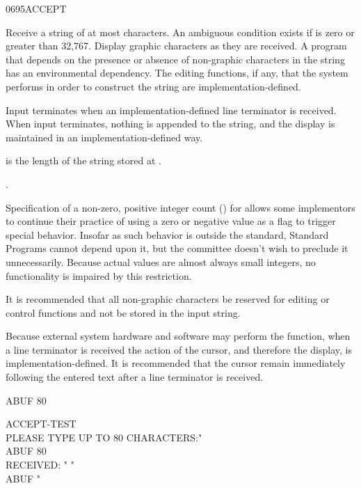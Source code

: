 \begin{worddef}{0695}{ACCEPT}
\item {}

	Receive a string of at most  characters. An ambiguous
	condition exists if  is zero or greater than 32,767.
	Display graphic characters as they are received. A program that
	depends on the presence or absence of non-graphic characters in the
	string has an environmental dependency. The editing functions, if
	any, that the system performs in order to construct the string are
	implementation-defined.

	Input terminates when an implementation-defined line terminator is
	received. When input terminates, nothing is appended to the string,
	and the display is maintained in an implementation-defined way.

	 is the length of the string stored at .

\see {}.

	\begin{rationale} %
		Specification of a non-zero, positive integer count ()
		for  allows some implementors to continue their
		practice of using a zero or negative value as a flag to trigger
		special behavior. Insofar as such behavior is outside the
		standard, Standard Programs cannot depend upon it, but the
		committee doesn't wish to preclude it unnecessarily.
		Because actual values are almost always small integers, no
		functionality is impaired by this restriction.

		It is recommended that all non-graphic characters be reserved
		for editing or control functions and not be stored in the input
		string.

		Because external system hardware and software may perform the
		 function, when a line terminator is received the
		action of the cursor, and therefore the display, is
		implementation-defined. It is recommended that the cursor remain
		immediately following the entered text after a line terminator
		is received.
	\end{rationale}

	\begin{testing} %
		\ttfamily
		 ABUF 80  

		\word{:} ACCEPT-TEST \\
		\tab[2]   PLEASE TYPE UP TO 80 CHARACTERS:"  \\
		\tab[2] ABUF 80  \\
		\tab[2]   RECEIVED: " \word{[CHAR]} "  \\
		\tab[2] ABUF   \word{[CHAR]} "   \\
		\word{;}

	\end{testing}
\end{worddef}


